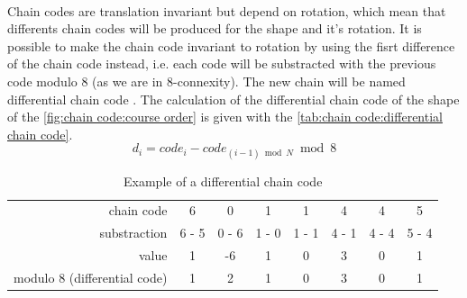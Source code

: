 ~~

Chain codes are translation invariant but depend on rotation, which mean that differents chain codes will be produced for the shape and it's rotation. It is possible to make the chain code invariant to rotation by using the fisrt difference of the chain code instead, i.e. each code will be substracted with the previous code modulo 8 (as we are in 8-connexity). The new chain will be named differential chain code \cite{bib:chain:RepresentationAndDescription}. The calculation of the differential chain code of the shape of the \vref{fig:chain code:course order} is given with the \vref{tab:chain code:differential chain code}.
\begin{equation} \label{eq:chain code:differential chain code}
d_i = code_i - code_{(i-1) \bmod N} \bmod 8
\end{equation}

\begin{table}[h]
	\centering
	\caption{Example of a differential chain code}
	\label{tab:chain code:differential chain code}
	\begin{tabular}{rccccccc}
\toprule 
chain code   & 6     & 0     & 1     & 1     & 4     & 4     & 5     \\
substraction & 6 - 5 & 0 - 6 & 1 - 0 & 1 - 1 & 4 - 1 & 4 - 4 & 5 - 4 \\
value     	 & 1     & -6    & 1     & 0     & 3     & 0     & 1     \\
modulo 8 (differential code)  	 & 1     & 2     & 1     & 0     & 3     & 0     & 1     \\ 
\bottomrule 
	\end{tabular}
\end{table}



